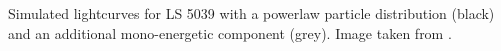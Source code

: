 Simulated lightcurves for LS 5039 with a powerlaw particle distribution (black) and an additional mono-energetic component (grey). Image taken from \cite{2015A&A...581A..27D}.\label{fig:simu_gamma}